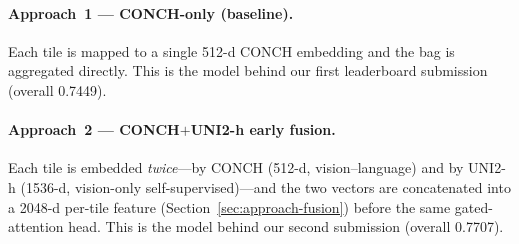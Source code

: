 \documentclass[11pt,a4paper]{article}
\begin{document}
\paragraph{Approach~1 --- CONCH-only (baseline).}
Each tile is mapped to a single 512-d CONCH embedding and the bag is aggregated directly. This is
the model behind our first leaderboard submission (overall 0.7449).

\paragraph{Approach~2 --- CONCH$+$UNI2-h early fusion.}
Each tile is embedded \emph{twice}---by CONCH (512-d, vision--language) and by UNI2-h (1536-d,
vision-only self-supervised)---and the two vectors are concatenated into a 2048-d per-tile feature
(Section~\ref{sec:approach-fusion}) before the same gated-attention head. This is the model behind
our second submission (overall 0.7707).
\end{document}
